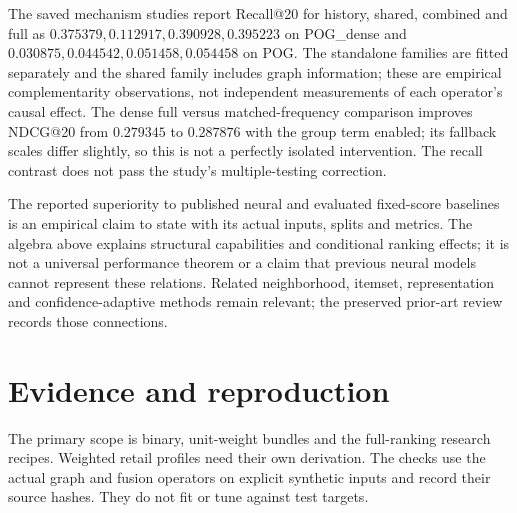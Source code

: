 \documentclass[11pt,a4paper]{article}
\begin{document}
The saved mechanism studies report Recall@20 for history, shared, combined and
full as $0.375379,0.112917,0.390928,0.395223$ on POG\_dense and
$0.030875,0.044542,0.051458,0.054458$ on POG. The standalone families are fitted
separately and the shared family includes graph information; these are empirical
complementarity observations, not independent measurements of each operator's
causal effect. The dense full versus matched-frequency comparison improves
NDCG@20 from $0.279345$ to $0.287876$ with the group term enabled; its fallback
scales differ slightly, so this is not a perfectly isolated intervention.
The recall contrast does not pass the study's multiple-testing correction.

The reported superiority to published neural and evaluated fixed-score baselines
is an empirical claim to state with its actual inputs, splits and metrics. The
algebra above explains structural capabilities and conditional ranking effects;
it is not a universal performance theorem or a claim that previous neural models
cannot represent these relations. Related neighborhood, itemset, representation
and confidence-adaptive methods remain relevant; the preserved prior-art review
records those connections.

\appendix
\section{Evidence and reproduction}
The primary scope is binary, unit-weight bundles and the full-ranking research
recipes. Weighted retail profiles need their own derivation. The checks use the
actual graph and fusion operators on explicit synthetic inputs and record their
source hashes. They do not fit or tune against test targets.
\end{document}
